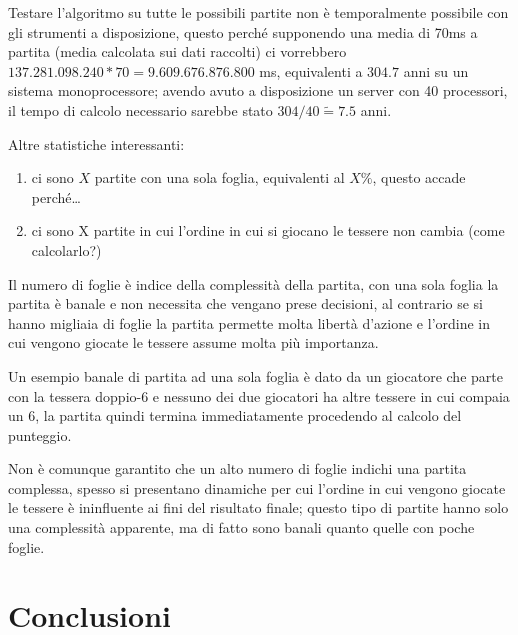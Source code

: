 \documentclass[a4paper.12pt]{report} %
\begin{document}
Testare l'algoritmo su tutte le possibili partite non è temporalmente possibile con gli strumenti a disposizione, questo perché supponendo una media di 70ms a partita (media calcolata sui dati raccolti) ci vorrebbero \(137.281.098.240 * 70  = 9.609.676.876.800\) ms, equivalenti a \(304.7\) anni su un sistema monoprocessore; avendo avuto a disposizione un server con 40 processori, il tempo di calcolo necessario sarebbe stato \(304 / 40 \tilde= 7.5\) anni. 


Altre statistiche interessanti: 
\begin{enumerate}
    \item ci sono \( X \) partite con una sola foglia, equivalenti al \( X\%\), questo accade perché\dots
    \item ci sono X partite in cui l'ordine in cui si giocano le tessere non cambia (come calcolarlo?)
\end{enumerate}

Il numero di foglie è indice della complessità della partita, con una sola foglia la partita è banale e non necessita che vengano prese decisioni, al contrario se si hanno migliaia di foglie la partita permette molta libertà d'azione e l'ordine in cui vengono giocate le tessere assume molta più importanza.

Un esempio banale di partita ad una sola foglia è dato da un giocatore che parte con la tessera doppio-6 e nessuno dei due giocatori ha altre tessere in cui compaia un 6, la partita quindi termina immediatamente procedendo al calcolo del punteggio.

Non è comunque garantito che un alto numero di foglie indichi una partita complessa, spesso si presentano dinamiche per cui l'ordine in cui vengono giocate le tessere è ininfluente ai fini del risultato finale; questo tipo di partite hanno solo una complessità apparente, ma di fatto sono banali quanto quelle con poche foglie.




\chapter{Conclusioni}
\end{document}
